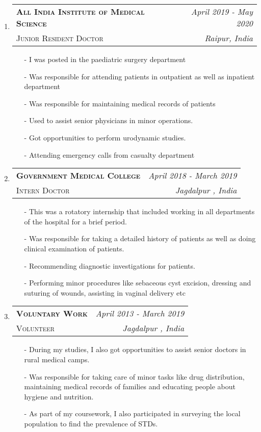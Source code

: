 \documentclass[letterpaper,10pt]{article}
\makeatletter
\newcommand{\workitem}[4]{
\begin{tabular*}{6.5in}{l @{\extracolsep{\fill}} r}
		\textbf{\textsc{#1}} & \textit{#2} \\
		\textsc{#3} & \textit{#4} \\
\end{tabular*}\vspace{-4pt}}
\newcommand{\workitemfull}[4]{
	\item[$\bullet$]\workitem{#1}{#2}{#3}{#4}
}
\makeatother
\begin{document}
\begin{enumerate}
	\workitemfull{All India Institute of Medical Science}{April 2019 - May 2020}{Junior Resident Doctor}{Raipur, India}
	\begin{enumerate}
		\item[-] I was posted in the paediatric surgery department
		\item[-] Was responsible for attending patients in outpatient as well as inpatient department
		\item[-] Was responsible for maintaining medical records of patients
		\item[-] Used to assist senior physicians in minor operations.
		\item[-] Got opportunities to perform urodynamic studies.
		\item[-] Attending emergency calls from casualty department
	\end{enumerate}
	\workitemfull{Government Medical College}{April 2018 - March 2019}{Intern Doctor}{Jagdalpur , India}
	\begin{enumerate}
		\item[-] This was a rotatory internship that included working in all departments of the hospital for a brief period.  
		\item[-] Was responsible for taking a detailed history of patients as well as doing clinical examination of patients.
		\item[-] Recommending diagnostic investigations for patients. 
		\item[-] Performing minor procedures like sebaceous cyst excision, dressing and suturing of wounds, assisting in vaginal delivery etc
	\end{enumerate}
	\workitemfull{Voluntary Work}{April 2013 - March 2019}{Volunteer}{Jagdalpur , India}
	\begin{enumerate}
		\item[-] During my studies, I also got opportunities to assist senior doctors in rural medical camps.
		\item[-] Was responsible for taking care of minor tasks like  drug distribution, maintaining medical records of families and educating people about hygiene and nutrition.
		
		\item[-] As part of my coursework, I also participated in surveying the local population to find the prevalence of STDs.
	
	\end{enumerate}

	
\end{enumerate}


\begin{minipage}{\textwidth}


\end{minipage}
\end{document}
